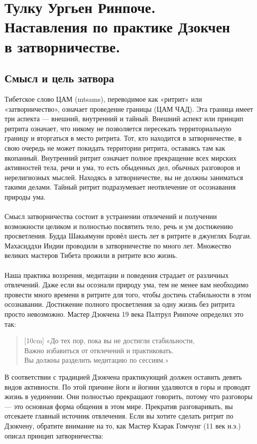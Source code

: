 \section{Тулку Ургьен Ринпоче.\\
Наставления по практике Дзокчен\\
в затворничестве.}
\subsection{Смысл и цель затвора}
Тибетское слово ЦАМ (mtsams), переводимое как «ритрит» или «затворничество», означает проведение границы (ЦАМ ЧАД). Эта граница имеет три аспекта — внешний, внутренний и тайный. Внешний аспект или принцип ритрита означает, что никому не позволяется пересекать территориальную границу и вторгаться в место ритрита. Тот, кто находится в затворничестве, в свою очередь не может покидать территории ритрита, оставаясь там как вкопанный. Внутренний ритрит означает полное прекращение всех мирских активностей тела, речи и ума, то есть обыденных дел, обычных разговоров и нерелигиозных мыслей. Находясь в затворничестве, вы не должны заниматься такими делами. Тайный ритрит подразумевает неотвлечение от осознавания природы ума.
\\ \\ Смысл затворничества состоит в устранении отвлечений и получении возможности целиком и полностью посвятить тело, речь и ум достижению просветления. Будда Шакьямуни провёл шесть лет в ритрите в джунглях Бодгаи. Махасиддхи Индии проводили в затворничестве по много лет. Множество великих мастеров Тибета прожили в ритрите всю жизнь.
\\ \\ Наша практика воззрения, медитации и поведения страдает от различных отвлечений. Даже если вы осознали природу ума, тем не менее вам необходимо провести много времени в ритрите для того, чтобы достичь стабильности в этом осознавании. Достижение полного просветления за одну жизнь без ритрита просто невозможно. Мастер Дзокчена 19 века Палтрул Ринпоче определил это так:
\newpage
\begin{verse}[10cm]
«До тех пор, пока вы не достигли стабильности, \\
Важно избавиться от отвлечений и практиковать. \\
Вы должны разделить медитацию по сессиям.»
\end{verse}
В соответствии с традицией Дзокчена практикующий должен оставить девять видов активности. По этой причине йоги и йогини удаляются в горы и проводят жизнь в уединении. Они полностью прекращают говорить, потому что разговоры — это основная форма общения в этом мире. Прекратив разговаривать, вы отсекаете главный источник отвлечения. Если вы хотите сделать ритрит по Дзокчену, обратите внимание на то, как Мастер Кхарак Гомчунг (11 век н.э.) описал принцип затворничества:
